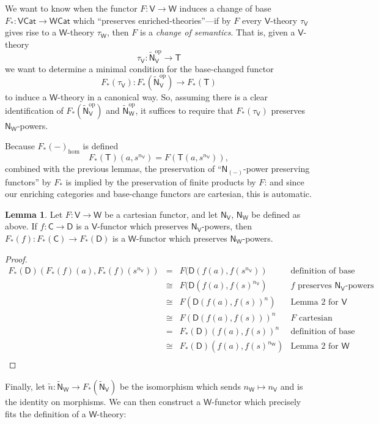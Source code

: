 \documentclass{amsart}
\theoremstyle{definition}
\newtheorem{lemma}[theorem]{Lemma}
\newcommand{\Cat}{\mathsf{Cat}}
\newcommand{\NN}{\mathsf{N}}
\newcommand{\V}{\mathsf{V}}
\newcommand{\W}{\mathsf{W}}
\newcommand{\D}{\mathsf{D}}
\newcommand{\C}{\mathsf{C}}
\newcommand{\T}{\mathsf{T}}
\newcommand{\op}{\mathrm{op}}
\newcommand{\maps}{\colon}
\begin{document}
We want to know when the functor $F\maps\V \to \W$ induces a change of base $F_*\maps\V\Cat \to \W\Cat$ which ``preserves enriched-theories''---if by $F$ every $\V$-theory $\tau_\V$ gives rise to a $\W$-theory $\tau_\W$, then $F$ is a \textit{change of semantics}. That is, given a $\V$-theory $$\tau_\V\maps \tilde{\NN}_\V^\op \to \T$$ we want to determine a minimal condition for the base-changed functor $$F_*(\tau_\V)\maps F_*(\tilde{\NN}_\V^\op) \to F_*(\T)$$ to induce a $\W$-theory in a canonical way. So, assuming there is a clear identification of $F_*(\tilde{\NN}_\V^\op)$ and $\tilde{\NN}_\W^\op$, it suffices to require that $F_*(\tau_\V)$ preserves $\NN_\W$-powers.

Because $F_*(-)_{\text{hom}}$ is defined $$F_*(\T)(a,s^{n_\V}) = F(\T(a,s^{n_\V})),$$ combined with the previous lemmas, the preservation of ``$\NN_{(-)}$-power preserving functors'' by $F_*$ is implied by the preservation of finite products by $F$: and since our enriching categories and base-change functors are cartesian, this is automatic.

\begin{lemma}
	Let $F\maps \V \to \W$ be a cartesian functor, and let $\NN_\V$, $\NN_\W$ be defined as above. If $f\maps \C \to \D$ is a $\V$-functor which preserves $\NN_\V$-powers, then $F_*(f)\maps F_*(\C)\to F_*(\D)$ is a $\W$-functor which preserves $\NN_\W$-powers.
\end{lemma}
\begin{proof}
	\[\begin{array}{rcll}
	F_*(\D)(F_*(f)(a),F_*(f)(s^{n_\V})) & = & F(\D(f(a),f(s^{n_\V})) & \text{definition of base change}\\
	& \cong & F(\D(f(a),f(s)^{n_\V}) & f \text{ preserves } \NN_\V \text{-powers}\\
	& \cong & F(\D(f(a),f(s))^n) & \text{Lemma 2 for } \V\\
	& \cong & F(\D(f(a),f(s)))^n & F \text{ cartesian}\\
	& = & F_*(\D)(f(a),f(s))^n & \text{definition of base change}\\
	& \cong & F_*(\D)(f(a),f(s)^{n_\W}) & \text{Lemma 2 for } \W\\
	\end{array}\]
\end{proof}

Finally, let $\tilde{n}\maps \tilde{\NN}_\W \to F_*(\tilde{\NN}_\V)$ be the isomorphism which sends $n_\W \mapsto n_\V$ and is the identity on morphisms. We can then construct a $\W$-functor which precisely fits the definition of a $\W$-theory:
\end{document}
